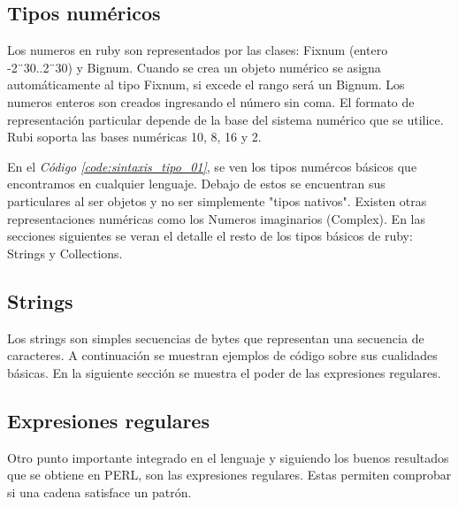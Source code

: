 \documentclass{article}
\newcommand{\refcode}[1]{\textit{Código \ref{#1}}}
\begin{document}
\subsection{Tipos numéricos}
Los numeros en ruby son representados por las clases: Fixnum (entero  -2¨30..2¨30) y Bignum.
Cuando se crea un objeto numérico se asigna automáticamente al tipo Fixnum, si excede el rango será un Bignum.
Los numeros enteros son creados ingresando el número sin coma. El formato de representación particular depende de la base del sistema numérico que se utilice. Rubi soporta las bases numéricas 10, 8, 16 y 2.

 
\bigskip

	En el \refcode{code:sintaxis_tipo_01}, se ven los tipos numércos básicos que encontramos en cualquier lenguaje. Debajo de estos se encuentran sus particulares al ser objetos y no ser simplemente "tipos nativos". Existen otras representaciones numéricas como los Numeros imaginarios (Complex). En las secciones siguientes se veran el detalle el resto de los tipos básicos de ruby: Strings y Collections. 

\subsection{Strings}
Los strings son simples secuencias de bytes que representan una secuencia de caracteres. A continuación se muestran ejemplos de código sobre sus cualidades básicas. En la siguiente sección se muestra el poder de las expresiones regulares.

 
\bigskip

 
\bigskip

 
\bigskip

\subsection{Expresiones regulares}
Otro punto importante integrado en el lenguaje y siguiendo los buenos resultados que se obtiene en PERL, son las expresiones regulares. Estas permiten comprobar si una cadena satisface un patrón.
\end{document}
